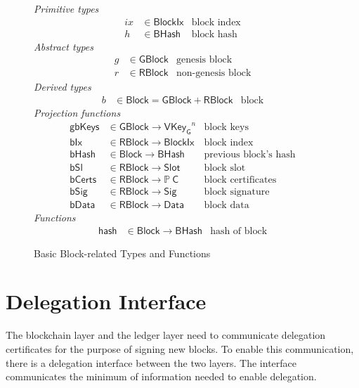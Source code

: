 \documentclass[11pt,a4paper]{article}
\newcommand{\powerset}[1]{\mathbb{P}~#1}
\newcommand{\fun}[1]{\mathsf{#1}}
\newcommand{\type}[1]{\mathsf{#1}}
\newcommand{\BHash}{\type{BHash}}  %
\newcommand{\Slot}{\type{Slot}}
\newcommand{\BlockIx}{\type{BlockIx}}
\newcommand{\GBlock}{\type{GBlock}}
\newcommand{\RBlock}{\type{RBlock}}
\newcommand{\Block}{\type{Block}}
\newcommand{\HCert}{\type{C}}
\newcommand{\VKeyGen}{\type{VKey_G}}
\newcommand{\Sig}{\type{Sig}}
\newcommand{\Data}{\type{Data}}
\newcommand{\hashname}{bHash}
\newcommand{\hashofblockname}{hash}
\newcommand{\bdataname}{bData}
\newcommand{\bcertsname}{bCerts}
\newcommand{\bsigname}{bSig}
\newcommand{\bixname}{bIx}
\newcommand{\bslname}{bSl}
\newcommand{\totalf}{\to}
\begin{document}
\begin{figure}
  \emph{Primitive types}
  \begin{align*}
    ix & \in \BlockIx & \text{block index}\\
     h & \in \BHash   & \text{block hash}
  \end{align*}
  \emph{Abstract types}
  \begin{align*}
    g & \in \GBlock & \text{genesis block} \\
    r & \in \RBlock & \text{non-genesis block}
  \end{align*}
  \emph{Derived types}
  \begin{align*}
    b & \in \Block = \GBlock + \RBlock & \text{block}
  \end{align*}
  \emph{Projection functions}
  \begin{align*}
    \fun{gbKeys} & \in \GBlock \totalf \VKeyGen^n & \text{block keys} \\
    \fun{\bixname} & \in \RBlock \totalf \BlockIx & \text{block index} \\
    \fun{\hashname} & \in \Block \totalf \BHash
      & \text{previous block's hash} \\
    \fun{\bslname} & \in \RBlock \totalf \Slot & \text{block slot} \\
    \fun{\bcertsname} & \in \RBlock \totalf \powerset{\HCert}
      & \text{block certificates} \\
    \fun{\bsigname} & \in \RBlock \totalf \Sig & \text{block signature} \\
    \fun{\bdataname} & \in \RBlock \totalf \Data & \text{block data}
  \end{align*}
  \emph{Functions}
  \begin{align*}
    \fun{\hashofblockname} & \in \Block \totalf \BHash & \text{hash of block}
  \end{align*}
  \caption{Basic Block-related Types and Functions}
  \label{fig:block-defs}
\end{figure}


\section{Delegation Interface}
\label{sec:del-interface}

The blockchain layer and the ledger layer need to communicate delegation
certificates for the purpose of signing new blocks.
%
To enable this communication, there is a delegation interface between the two
layers.
%
The interface communicates the minimum of information needed to enable
delegation.
\end{document}

